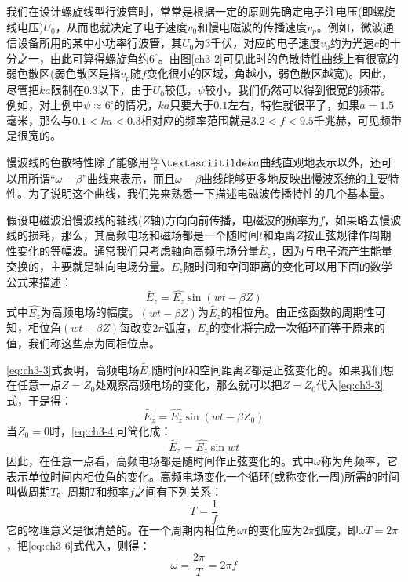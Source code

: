 我们在设计螺旋线型行波管时，常常是根据一定的原则先确定电子注电压(即螺旋线电压)$ U_0 $，从而也就决定了电子速度$ v_0 $和慢电磁波的传播速度$ v_p $。例如，微波通信设备所用的某中小功率行波管，其$ U_0 $为3千伏，对应的电子速度$ v_0 $约为光速$ c $的十分之一，由此可算得螺旋角约$ 6^\circ $。由图\ref{ch3-2}可见此时的色散特性曲线上有很宽的弱色散区(弱色散区是指$ v_p $随$ f $变化很小的区域，角越小，弱色散区越宽)。因此，尽管把$ ka $限制在0.3以下，由于$ U_0 $较低，$ \psi $较小，我们仍然可以得到很宽的频带。例如，对上例中$ \psi \approx 6 ^\circ $的情况，$ ka $只要大于$ 0.1 $左右，特性就很平了，如果$ a=1.5 $毫米，那么与$ 0.1<ka<0.3 $相对应的频率范围就是$ 3.2<f<9.5 $千兆赫，可见频带是很宽的。

慢波线的色散特性除了能够用$ \frac{v_p}{c}\textasciitilde ka$曲线直观地表示以外，还可以用所谓“$\omega -\beta $”曲线来表示，而且$ \omega-\beta $曲线能够更多地反映出慢波系统的主要特性。为了说明这个曲线，我们先来熟悉一下描述电磁波传播特性的几个基本量。

假设电磁波沿慢波线的轴线($ Z $轴)方向向前传播，电磁波的频率为$ f $，如果略去慢波线的损耗，那么，其高频电场和磁场都是一个随时间$ t $和距离$ Z $按正弦规律作周期性变化的等幅波。通常我们只考虑轴向高频电场分量$ \tilde{E_z} $，因为与电子流产生能量交换的，主要就是轴向电场分量。$ \tilde{E_z} $随时间和空间距离的变化可以用下面的数学公式来描述：
\begin{equation} \label{eq:ch3-3}
	\tilde{E_z} = \hat{E_z}\sin(wt-\beta Z)
\end{equation}
式中$ \hat{E_z} $为高频电场的幅度。$ (wt-\beta Z) $为$ \tilde{E_z} $的相位角。由正弦函数的周期性可知，相位角$ (wt-\beta Z) $每改变$ 2\pi $弧度，$ \tilde{E_z} $的变化将完成一次循环而等于原来的值，我们称这些点为同相位点。

\eqref{eq:ch3-3}式表明，高频电场$ \tilde{E_z} $随时间$ t $和空间距离$ Z $都是正弦变化的。如果我们想在任意一点$ Z=Z_0 $处观察高频电场的变化，那么就可以把$ Z=Z_0 $代入\eqref{eq:ch3-3}式，于是得：
\begin{equation} \label{eq:ch3-4}
	\tilde{E_z} = \hat{E_z}\sin(wt-\beta Z_0)
\end{equation}
当$ Z_0=0 $时，\ref{eq:ch3-4}可简化成：
\begin{equation} \label{eq:ch3-5}
\tilde{E_z} = \hat{E_z}\sin{wt}
\end{equation}
因此，在任意一点看，高频电场都是随时间作正弦变化的。式中$ \omega $称为角频率，它表示单位时间内相位角的变化。高频电场变化一个循环(或称变化一周)所需的时间叫做周期$ T $。周期$ T $和频率$ f $之间有下列关系：
\begin{equation} \label{eq:ch3-6}
	T = \frac{1}{f}
\end{equation}
它的物理意义是很清楚的。在一个周期内相位角$ \omega t $的变化应为$ 2\pi $弧度，即$ \omega T = 2\pi $，把\eqref{eq:ch3-6}式代入，则得：
\begin{equation} \label{eq:ch3-7}
	\omega = \frac{2\pi}{T} = 2\pi f
\end{equation}
 
